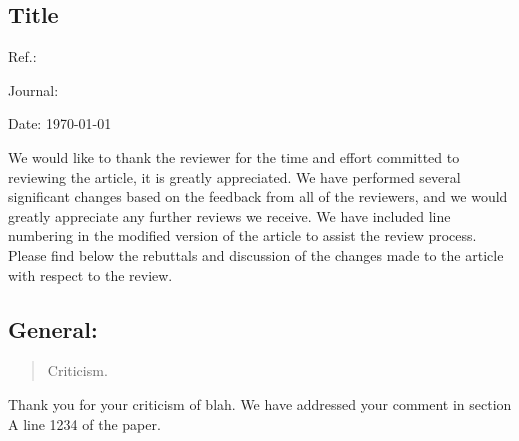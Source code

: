 \documentclass[a4paper,11pt]{article}
\author{}
\date{}
\begin{document}
\hypertarget{title-with-no-spaces}{%
\subsection{Title}\label{title-with-no-spaces}}

Ref.: 

Journal:

Date: \today

We would like to thank the reviewer for the time and effort committed to reviewing the article, it is greatly appreciated.
We have performed several significant changes based on the feedback from all of the reviewers, and we would greatly appreciate any further reviews we receive.
We have included line numbering in the modified version of the article to assist the review process.
Please find below the rebuttals and discussion of the changes made to the article with respect to the review. 

\hypertarget{general-1}{%
\subsection{General:}\label{general-1}}

\begin{quote}
Criticism.
\end{quote}

Thank you for your criticism of blah. 
We have addressed your comment in section A line 1234 of the paper.



\end{document}
